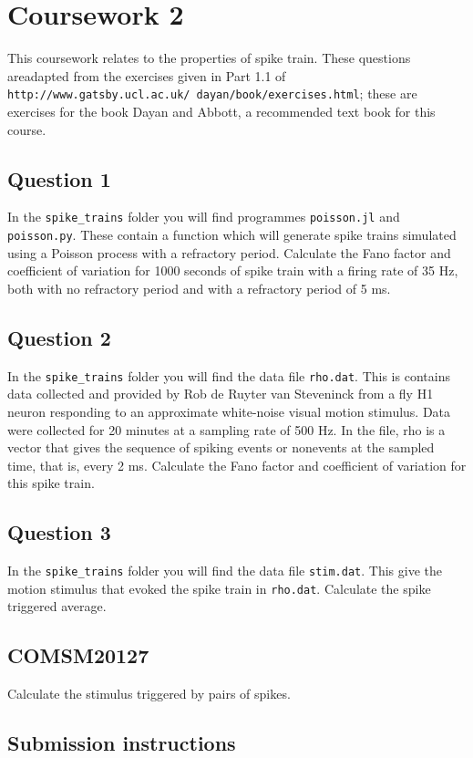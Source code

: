 \documentclass[12pt]{article}
\begin{document}
\section*{Coursework 2}

This coursework relates to the properties of spike train. These
questions areadapted from the exercises given in Part 1.1 of
\texttt{http://www.gatsby.ucl.ac.uk/~dayan/book/exercises.html}; these
are exercises for the book Dayan and Abbott, a recommended text book
for this course.


\subsection*{Question 1}

In the \texttt{spike\_trains} folder you will find programmes
\texttt{poisson.jl} and \texttt{poisson.py}. These contain a function
which will generate spike trains simulated using a Poisson process
with a refractory period. Calculate the Fano factor and coefficient of
variation for 1000 seconds of spike train with a firing rate of 35 Hz,
both with no refractory period and with a refractory period of 5 ms.

\subsection*{Question 2}

In the \texttt{spike\_trains} folder you will find the data file
\texttt{rho.dat}. This is contains data collected and provided by Rob
de Ruyter van Steveninck from a fly H1 neuron responding to an
approximate white-noise visual motion stimulus. Data were collected
for 20 minutes at a sampling rate of 500 Hz. In the file, rho is a
vector that gives the sequence of spiking events or nonevents at the
sampled time, that is, every 2 ms. Calculate the Fano factor and coefficient of variation for this spike train.

\subsection*{Question 3} 

In the \texttt{spike\_trains} folder you will find the data file
\texttt{stim.dat}. This give the motion stimulus that evoked the spike
train in \texttt{rho.dat}. Calculate the spike triggered average.

\subsection*{COMSM20127}

Calculate the stimulus triggered by pairs of spikes.

\subsection*{Submission instructions}
\end{document}
